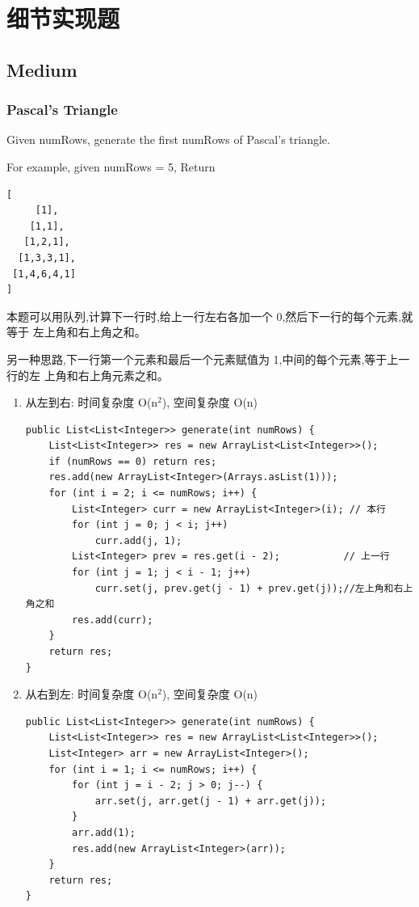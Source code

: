 \documentclass[12pt]{book}
\begin{document}
\chapter{细节实现题}
\label{sec-20}
\section{Medium}
\label{sec-20-1}
\subsection{Pascal's Triangle}
\label{sec-20-1-1}
Given numRows, generate the first numRows of Pascal's triangle.

For example, given numRows = 5,
Return
\lstset{language=java,label= ,caption= ,numbers=none}
\begin{lstlisting}
[
     [1],
    [1,1],
   [1,2,1],
  [1,3,3,1],
 [1,4,6,4,1]
]
\end{lstlisting}

本题可以用队列,计算下一行时,给上一行左右各加一个 0,然后下一行的每个元素,就等于
左上角和右上角之和。

另一种思路,下一行第一个元素和最后一个元素赋值为 1,中间的每个元素,等于上一行的左
上角和右上角元素之和。

\begin{enumerate}
\item 从左到右: 时间复杂度 O(n$^{\text{2}}$), 空间复杂度 O(n)
\label{sec-20-1-1-1}
\lstset{language=java,label= ,caption= ,numbers=none}
\begin{lstlisting}
public List<List<Integer>> generate(int numRows) {
    List<List<Integer>> res = new ArrayList<List<Integer>>();
    if (numRows == 0) return res;
    res.add(new ArrayList<Integer>(Arrays.asList(1)));
    for (int i = 2; i <= numRows; i++) {
        List<Integer> curr = new ArrayList<Integer>(i); // 本行
        for (int j = 0; j < i; j++) 
            curr.add(j, 1);
        List<Integer> prev = res.get(i - 2);           // 上一行
        for (int j = 1; j < i - 1; j++) 
            curr.set(j, prev.get(j - 1) + prev.get(j));//左上角和右上角之和
        res.add(curr);
    }
    return res;
}
\end{lstlisting}

\item 从右到左: 时间复杂度 O(n$^{\text{2}}$), 空间复杂度 O(n)
\label{sec-20-1-1-2}

\lstset{language=java,label= ,caption= ,numbers=none}
\begin{lstlisting}
public List<List<Integer>> generate(int numRows) {
    List<List<Integer>> res = new ArrayList<List<Integer>>();
    List<Integer> arr = new ArrayList<Integer>();
    for (int i = 1; i <= numRows; i++) {
        for (int j = i - 2; j > 0; j--) {
            arr.set(j, arr.get(j - 1) + arr.get(j));
        }
        arr.add(1);
        res.add(new ArrayList<Integer>(arr));
    }
    return res;
}
\end{lstlisting}
\end{enumerate}
\end{document}
